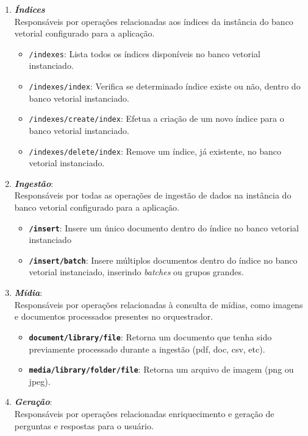 \documentclass[a4paper, 12pt]{article}
\begin{document}
    \begin{enumerate}
        \item \textbf{\textit{Índices}}\\
        Responsáveis por operações relacionadas aos índices da instância do banco vetorial configurado para a aplicação.
        \begin{itemize}
            \item \texttt{/indexes}: Lista todos os índices disponíveis no banco vetorial instanciado.
            \item \texttt{/indexes/index}: Verifica se determinado índice existe ou não, dentro do banco vetorial instanciado.
            \item \texttt{/indexes/create/index}: Efetua a criação de um novo índice para o banco vetorial instanciado.
            \item \texttt{/indexes/delete/index}: Remove um índice, já existente, no banco vetorial instanciado.
        \end{itemize}
        \item \textbf{\textit{Ingestão}}:\\ Responsáveis por todas as operações de ingestão de dados na instância do banco vetorial configurado para a aplicação.
        \begin{itemize}
            \item \textbf{\texttt{/insert}}: Insere um único documento dentro do índice no banco vetorial instanciado
            \item \textbf{\texttt{/insert/batch}}: Insere múltiplos documentos dentro do índice no banco vetorial instanciado, inserindo \textit{batches} ou grupos grandes.
        \end{itemize}
        \item \textbf{\textit{Mídia}}:\\ Responsáveis por operações relacionadas à consulta de mídias, como imagens e documentos processados presentes no orquestrador.
        \begin{itemize}
            \item \textbf{\texttt{document/library/file}}: Retorna um documento que tenha sido previamente processado durante a ingestão (pdf, doc, csv, etc).
            \item \textbf{\texttt{media/library/folder/file}}: Retorna um arquivo de imagem (png ou jpeg).
        \end{itemize}
        \item \textbf{\textit{Geração}}:\\ Responsáveis por operações relacionadas enriquecimento e geração de perguntas e respostas para o usuário.

\end{enumerate}
\end{document}

